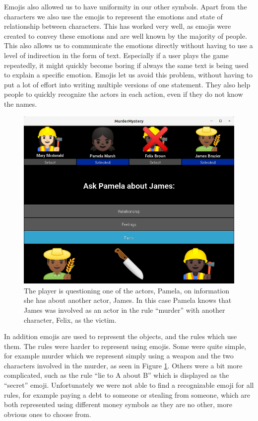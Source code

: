 Emojis also allowed us to have uniformity in our other symbols.
Apart from the characters we also use the emojis to represent the emotions and state of relationship between characters.
This has worked very well, as emojis were created to convey these emotions and are well known by the majority of people.
This also allows us to communicate the emotions directly without having to use a level of indirection in the form of text.
Especially if a user plays the game repeatedly, it might quickly become boring if always the same text is being used to explain a specific emotion.
Emojis let us avoid this problem, without having to put a lot of effort into writing multiple versions of one statement.
They also help people to quickly recognize the actors in each action, even if they do not know the names.

\begin{figure}
  \includegraphics[width=\columnwidth]{murder_screenshot.png}
  \caption{The player is questioning one of the actors, Pamela, on information she has about another actor, James. In this case Pamela knows that James was involved as an actor in the rule \enquote{murder} with another character, Felix, as the victim.}
  \label{fig:murder}
\end{figure}

In addition emojis are used to represent the objects, and the rules which use them.
The rules were harder to represent using emojis.
Some were quite simple, for example murder which we represent simply using a weapon and the two characters involved in the murder, as seen in Figure \ref{fig:murder}.
Others were a bit more complicated, such as the rule \enquote{lie to A about B} which is displayed as the \enquote{secret} emoji.
Unfortunately we were not able to find a recognizable emoji for all rules, for example paying a debt to someone or stealing from someone, which are both represented using different money symbols as they are no other, more obvious ones to choose from.
